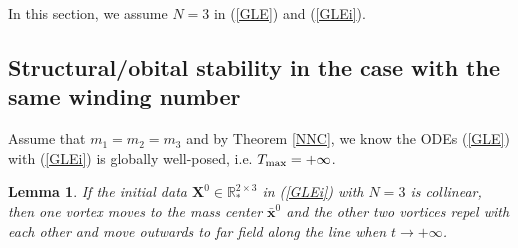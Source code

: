 \documentclass{aims}
\theoremstyle{plain}
\newtheorem{lemma}{Lemma}[section]
\theoremstyle{definition}
\newcommand{\bx}{{\mathbf x}}
\newcommand{\bX}{{\mathbf X}}
\begin{document}
 In this section, we assume $N=3$ in (\ref{GLE}) and (\ref{GLEi}).


\subsection{Structural/obital stability in the case with the same winding number}
Assume that $m_1=m_2=m_3$ and by Theorem
\ref{NNC}, we know the ODEs (\ref{GLE}) with (\ref{GLEi})
is globally well-posed, i.e. $T_{\rm max}=+\infty$.



\begin{lemma}\label{invariants}
If the initial data $\bX^0\in {\mathbb R}_*^{2\times 3}$ in (\ref{GLEi}) with
$N=3$ is collinear, then one vortex moves to the mass center
$\bar\bx^0$  and the other two vortices repel with each other and move outwards to far field along the line when $t\to+\infty$.
\end{lemma}
\end{document}
